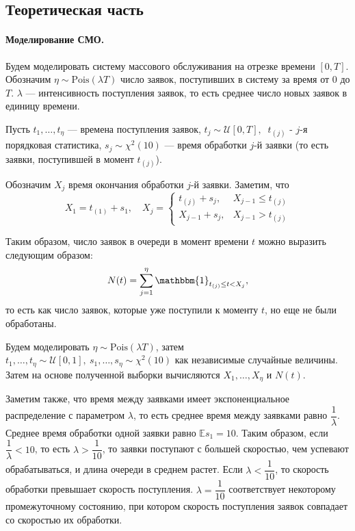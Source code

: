\documentclass[16pt]{article}
\newcommand{\I}{\mathbbm{1}}
\begin{document}
\subsection{Теоретическая часть}
\paragraph{Моделирование СМО.}
Будем моделировать систему массового обслуживания на отрезке времени $[0, T]$. Обозначим $\eta \sim \mathrm{Pois}(\lambda T)$ число заявок, поступивших в систему за время от $0$ до $T$. $\lambda$ --- интенсивность поступления заявок, то есть среднее число новых заявок в единицу времени.

Пусть $t_1, \ldots, t_\eta$ --- времена поступления заявок, $t_j \sim \mathcal{U}[0, T],\ $ $t_{(j)}$ - $j$-я порядковая статистика, $s_j \sim \chi^2(10)$ --- время обработки $j$-й заявки (то есть заявки, поступившей в момент $t_{(j)}$).

Обозначим $X_j$ время окончания обработки $j$-й заявки. Заметим, что
$$X_1 = t_{(1)} + s_1, \quad 
X_j = \begin{cases}
t_{(j)} + s_j, & X_{j - 1} \leq t_{(j)} \\
X_{j-1} + s_j, & X_{j - 1} > t_{(j)}
\end{cases}
$$

Таким образом, число заявок в очереди в момент времени $t$ можно выразить следующим образом:
$$N(t) = \sum_{j=1}^{\eta}\I_{t_{(j)} \leq t < X_j},$$
то есть как число заявок, которые уже поступили к моменту $t$, но еще не были обработаны.

Будем моделировать $\eta \sim \mathrm{Pois}(\lambda T)$, затем $t_1, \ldots, t_\eta \sim \mathcal{U}[0, 1],\ s_1, \ldots, s_\eta \sim \chi^2(10)$ как независимые случайные величины. Затем на основе полученной выборки вычисляются $X_1, \ldots, X_\eta$ и $N(t)$.

Заметим также, что время между заявками имеет экспоненциальное распределение с параметром $\lambda$, то есть среднее время между заявками равно $\dfrac{1}{\lambda}$. Среднее время обработки одной заявки равно $\mathbb{E}s_1 = 10$. Таким образом, если $\dfrac{1}{\lambda} < 10$, то есть $\lambda > \dfrac{1}{10}$, то заявки поступают с большей скоростью, чем успевают обрабатываться, и длина очереди в среднем растет.
Если $\lambda < \dfrac{1}{10}$, то скорость обработки превышает скорость поступления. $\lambda = \dfrac{1}{10}$ соответствует некоторому промежуточному состоянию,
при котором скорость поступления заявок совпадает со скоростью их обработки.
\end{document}
